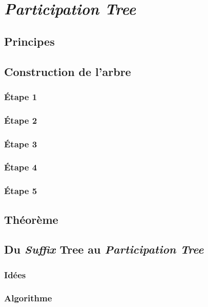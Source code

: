 \documentclass[a4paper]{article}
\begin{document}
\section{\textit{Participation Tree}}

\subsection{Principes}

\subsection{Construction de l'arbre}

\subsubsection{Étape 1}

\subsubsection{Étape 2}

\subsubsection{Étape 3}

\subsubsection{Étape 4}

\subsubsection{Étape 5}

\subsection{Théorème}

\subsection{Du \textit{Suffix} Tree au \textit{Participation Tree}}

\subsubsection{Idées}

\subsubsection{Algorithme}
\end{document}

